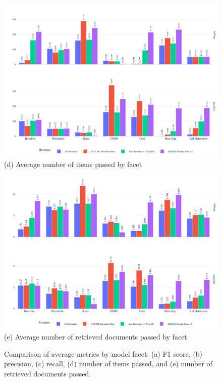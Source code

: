 \begin{figure}[htbp]
{\begin{minipage}{0.90\paperwidth}
      \begin{minipage}[b]{0.49\textwidth}
        \centering
        \includegraphics[width=\textwidth]{reranker/avg_num_items_passed_bar_faceted.png}
        \\[1ex]\footnotesize (d) Average number of items passed by facet
      \end{minipage}
      \hfill
      \begin{minipage}[b]{0.49\textwidth}
        \centering
        \includegraphics[width=\textwidth]{reranker/avg_num_retrieved_docs_passed_bar_faceted.png}
        \\[1ex]\footnotesize (e) Average number of retrieved documents passed by facet
      \end{minipage}
    \end{minipage}%
  }
  \caption{\footnotesize Comparison of average metrics by model facet:
    (a) F1 score, (b) precision, (c) recall, (d) number of items passed,
    and (e) number of retrieved documents passed.}
  \label{fig:avg_metrics_faceted}
\end{figure}

